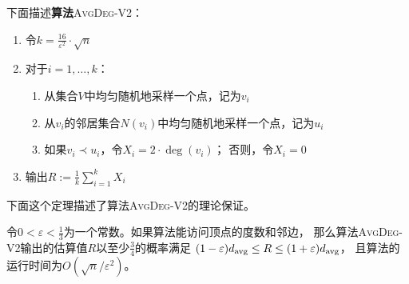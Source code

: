 下面描述\textbf{算法}\textsc{AvgDeg-V2}：
\begin{enumerate}
    \item 令$k=\frac{16}{\varepsilon^2}\cdot\sqrt{n}$
    \item 对于$i=1,\dots,k$：
    \begin{enumerate}
        \item[2.1] 从集合$V$中均匀随机地采样一个点，记为$v_i$
        \item[2.2] 从$v_i$的邻居集合$N(v_i)$中均匀随机地采样一个点，记为$u_i$
        \item[2.3] 如果$v_i\prec u_i$，令$X_i=2\cdot\deg(v_i)$；
        否则，令$X_i=0$
    \end{enumerate}
    \item 输出$R:=\frac{1}{k}\sum_{i=1}^kX_i$
\end{enumerate}

下面这个定理描述了算法\textsc{AvgDeg-V2}的理论保证。

\begin{theorem}
    令$0<\varepsilon<\frac{1}{3}$为一个常数。如果算法能访问顶点的度数和邻边，
    那么算法\textsc{AvgDeg-V2}输出的估算值$R$以至少$\frac{3}{4}$的概率满足
    $(1-\varepsilon)d_{\mathrm{avg}}\le R\le(1+\varepsilon)d_{\mathrm{avg}}$，
    且算法的运行时间为$O(\sqrt{n}/\varepsilon^2)$。
\end{theorem}

